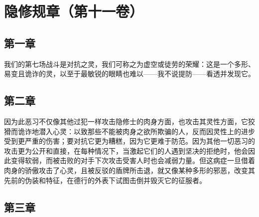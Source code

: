 

\section{隐修规章（第十一卷）}


\subsection{第一章}

\par

我们的第七场战斗是对抗之灵，我们可称之为虚空或徒劳的荣耀：这是一个多形、易变且诡诈的灵，以至于最敏锐的眼睛也难以——我不说提防——看透并发现它。\par


\subsection{第二章}

\par

因为此恶习不仅像其他过犯一样攻击隐修士的肉身方面，也攻击其灵性方面，它狡猾而诡诈地潜入心灵：以致那些不能被肉身之欲所欺骗的人，反而因灵性上的进步受到更严重的伤害；要对抗它更为糟糕，因为它更难于防范。因为其他一切恶习的攻击更为公开和直接，在每种情况下，当激起它们的人遇到坚决的拒绝时，他会因此变得软弱，而被击败的对手下次攻击受害人时也会减弱力量。但这病症一旦借着肉身的骄傲攻击了心灵，且被反驳的盾牌所击退，就又像某种多形的邪恶，改变其先前的伪装和特征，在德行的外表下试图击倒并毁灭它的征服者。\par


\subsection{第三章}

